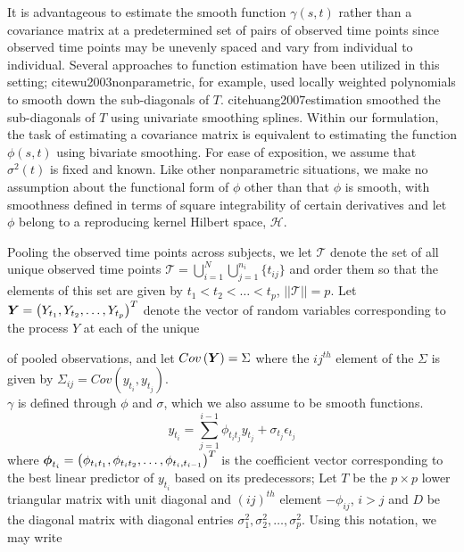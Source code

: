 \documentclass[12pt]{article}
\newcommand{\bfphi}{\mbox{\boldmath $\phi$}}
\newcommand{\bfY}{\mbox{\boldmath $Y$}}
\theoremstyle{definition}
\begin{document}
It is advantageous to estimate the smooth function $\gamma\left(s,t\right)$ rather than a covariance matrix at a predetermined set of pairs of observed time points since observed time points may be unevenly spaced and vary from individual to individual. Several approaches to function estimation have been utilized in this setting; cite{wu2003nonparametric}, for example, used locally weighted polynomials to smooth down the sub-diagonals of $T$. cite{huang2007estimation} smoothed the sub-diagonals of $T$ using univariate smoothing splines.  Within our formulation, the task of estimating a covariance matrix is equivalent to estimating the function $\phi\left(s,t\right)$ using bivariate smoothing. For ease of exposition, we assume that $\sigma^2\left(t\right)$ is fixed and known. Like other nonparametric situations, we make no assumption about the functional form of $\phi$ other than that $\phi$ is smooth, with smoothness defined in terms of square integrability of certain derivatives and let $\phi$ belong to a reproducing kernel Hilbert space, $\mathcal{H}$.

  Pooling the observed time points across subjects, we let $\mathcal{T}$ denote the set of all unique observed time points $\mathcal{T} = \bigcup \limits_{i=1}^{N} \bigcup\limits_{j=1}^{n_i}  \lbrace t_{ij} \rbrace$ and order them so that the elements of this set are given by $t_1 < t_2 < \dots < t_{p}$, $\vert \vert \mathcal{T} \vert \vert = p$. Let $\bfY = \left(Y_{t_1}, Y_{t_2}, \dots, Y_{t_p}\right)^T$ denote the vector of random variables corresponding to the process $Y$ at each of the unique 

of pooled observations, and let $Cov\left(\bfY \right) = \Sigma$ where the $ij^{th}$ element of the $\Sigma$ is given by $\Sigma_{ij} = Cov\left(y_{t_i}, y_{t_j}\right)$. \\

 $\gamma$ is defined through $\phi$ and $\sigma$, which we also assume to be smooth functions.
\begin{equation}
{y}_{t_i}  = \sum_{j=1}^{i-1} \phi_{{t_i}{t_j}} y_{t_j} + \sigma_{t_j}\epsilon_{t_j} \label{RV_ARmodel}
\end{equation}
\noindent
where $\bfphi_{t_i} = \left( \phi_{{t_i}{t_1}}, \phi_{{t_i}{t_2}}, \dots, \phi_{{t_i},{t_{i-1}}}\right)^T$ is the coefficient vector corresponding to the best linear predictor of $y_{t_i}$ based on its predecessors; Let $T$ be the $p \times p$ lower triangular matrix with unit diagonal and $\left(ij\right)^{th}$ element $-\phi_{ij}$, $i > j$ and $D$ be the diagonal matrix with diagonal entries $\sigma_1^2, \sigma_2^2, \dots, \sigma_p^2$. Using this notation, we may write 
\end{document}
